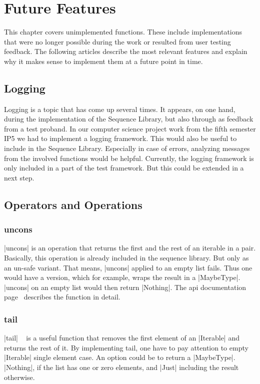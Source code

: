 \section{Future Features}
\label{sec:Future Features}
This chapter covers unimplemented functions. These include implementations that
were no longer possible during the work or resulted from user testing feedback.
The following articles describe the most relevant features and explain why it
makes sense to implement them at a future point in time.

\subsection{Logging}
\label{sub:Logging}
Logging is a topic that has come up several times. It appears, on one hand,
during the implementation of the Sequence Library, but also through as feedback
from a test proband. In our computer science project work from the fifth
semester IP5 we had to implement a logging framework. This would also be useful
to include in the Sequence Library. Especially in case of errors, analyzing
messages from the involved functions would be helpful. Currently, the logging
framework is only included in a part of the test framework. But this could be
extended in a next step.

\subsection{Operators and Operations}
\label{sub:Operators and Operations}

\subsubsection{uncons}
\label{subsub:uncons}
|uncons| is an operation that returns the first and the rest of an iterable in a
pair. Basically, this operation is already included in the sequence library.
But only as an un-safe variant. That means, |uncons| applied to an empty list
fails. Thus one would have a version, which for example, wraps the result in a
|MaybeType|. |uncons| on an empty list would then return |Nothing|. The
api documentation page~\cite{hoogle_uncons} describes the function in detail.

\subsubsection{tail}
\label{subsub:tail}
|tail| ~\cite{hoogle_tail} is a useful function that removes the first element of an |Iterable|
and returns the rest of it. By implementing tail, one have to pay attention to
empty |Iterable| single element case. An option could be to return a
|MaybeType|. |Nothing|, if the list has one or zero elements, and
|Just| including the result otherwise.

